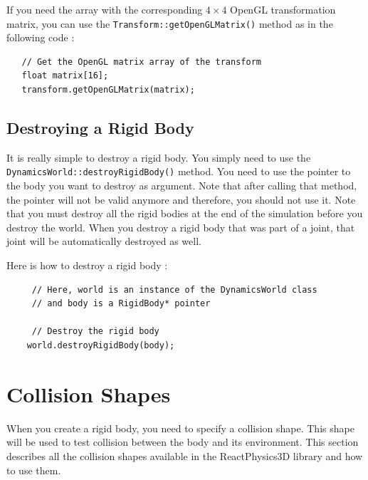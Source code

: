 \documentclass[a4paper,12pt]{article}
\begin{document}
    \vspace{0.6cm}

    If you need the array with the corresponding $4 \times 4$ OpenGL transformation matrix, you can use the \texttt{Transform::getOpenGLMatrix()} method as in the following code : \\

    \begin{lstlisting}
   // Get the OpenGL matrix array of the transform
   float matrix[16];
   transform.getOpenGLMatrix(matrix);
  \end{lstlisting}

    \subsection{Destroying a Rigid Body}

    \begin{sloppypar}
    It is really simple to destroy a rigid body. You simply need to use the \texttt{DynamicsWorld::destroyRigidBody()} method. You need to use the pointer to the body you
    want to destroy as argument. Note that after calling that method, the pointer will not be valid anymore and therefore, you should not use it. Note that you must
    destroy all the rigid bodies at the end of the simulation before you destroy the world. When you destroy a rigid body that was part of a joint, that joint will be automatically
    destroyed as well. \\
    \end{sloppypar}

    Here is how to destroy a rigid body : \\

    \begin{lstlisting}
     // Here, world is an instance of the DynamicsWorld class
     // and body is a RigidBody* pointer

     // Destroy the rigid body
    world.destroyRigidBody(body);
  \end{lstlisting}

    \section{Collision Shapes}
    \label{sec:collisionshapes}

    When you create a rigid body, you need to specify a collision shape. This shape will be used to test collision between the body and its environment.
    This section describes all the collision shapes available in the ReactPhysics3D library and how to use them. \\
\end{document}
